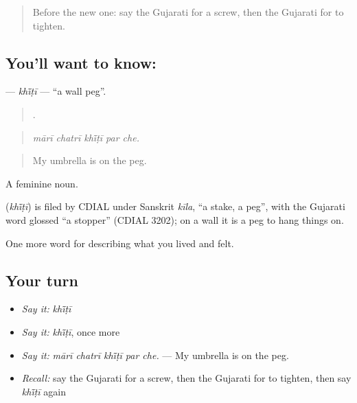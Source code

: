 \label{lesson:GU-C514-khiti}



\begin{quote}
Before the new one: say the Gujarati for a screw, then the Gujarati for to tighten.
\end{quote}

\subsection*{You'll want to know: }
\textbf{} — \emph{khī̃ṭī} — \textquotedblleft{}a wall peg\textquotedblright{}.

\begin{quote}
    .
\end{quote}

\begin{quote}
\emph{mārī chatrī khī̃ṭī par che.}
\end{quote}

\begin{quote}
My umbrella is on the peg.
\end{quote}

A feminine noun.

\begin{cousinweb}
\textbf{} (\emph{khī̃ṭī}) is filed by CDIAL under Sanskrit \emph{kīla}, \textquotedblleft{}a stake, a peg\textquotedblright{}, with the Gujarati word glossed \textquotedblleft{}a stopper\textquotedblright{} (CDIAL 3202); on a wall it is a peg to hang things on.
\end{cousinweb}

\begin{grammarlens}[title={What you've built}]
One more word for describing what you lived and felt.
\end{grammarlens}

\subsection*{Your turn}
\begin{itemize}
\raggedright
  \item \emph{Say it:} \emph{khī̃ṭī}
  \item \emph{Say it:} \emph{khī̃ṭī}, once more
  \item \emph{Say it:} \emph{mārī chatrī khī̃ṭī par che.} — My umbrella is on the peg.
  \item \emph{Recall:} say the Gujarati for a screw, then the Gujarati for to tighten, then say \emph{khī̃ṭī} again
\end{itemize}

